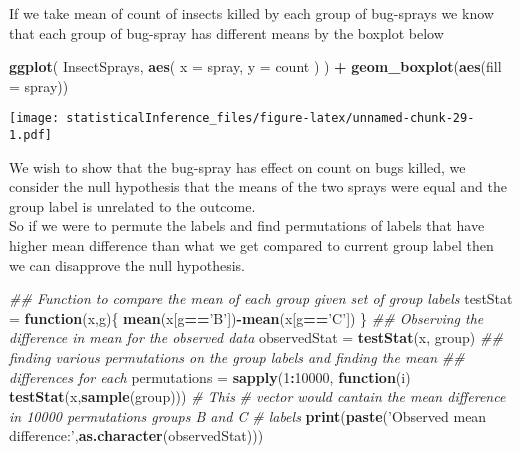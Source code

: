 \documentclass[
]{article}
\newenvironment{Shaded}{\begin{snugshade}}{\end{snugshade}}
\newcommand{\CommentTok}[1]{\textcolor[rgb]{0.56,0.35,0.01}{\textit{#1}}}
\newcommand{\ControlFlowTok}[1]{\textcolor[rgb]{0.13,0.29,0.53}{\textbf{#1}}}
\newcommand{\DataTypeTok}[1]{\textcolor[rgb]{0.13,0.29,0.53}{#1}}
\newcommand{\DecValTok}[1]{\textcolor[rgb]{0.00,0.00,0.81}{#1}}
\newcommand{\KeywordTok}[1]{\textcolor[rgb]{0.13,0.29,0.53}{\textbf{#1}}}
\newcommand{\NormalTok}[1]{#1}
\newcommand{\OperatorTok}[1]{\textcolor[rgb]{0.81,0.36,0.00}{\textbf{#1}}}
\newcommand{\StringTok}[1]{\textcolor[rgb]{0.31,0.60,0.02}{#1}}
\begin{document}
If we take mean of count of insects killed by each group of bug-sprays
we know that each group of bug-spray has different means by the boxplot
below

\begin{Shaded}
\begin{Highlighting}[]
\KeywordTok{ggplot}\NormalTok{(}
\NormalTok{  InsectSprays,}
  \KeywordTok{aes}\NormalTok{(}
    \DataTypeTok{x =}\NormalTok{ spray,}
    \DataTypeTok{y =}\NormalTok{ count}
\NormalTok{  )}
\NormalTok{) }\OperatorTok{+}\StringTok{ }\KeywordTok{geom_boxplot}\NormalTok{(}\KeywordTok{aes}\NormalTok{(}\DataTypeTok{fill =}\NormalTok{ spray))}
\end{Highlighting}
\end{Shaded}

\texttt{[image: statisticalInference\_files/figure-latex/unnamed-chunk-29-1.pdf]}

We wish to show that the bug-spray has effect on count on bugs killed,
we consider the null hypothesis that the means of the two sprays were
equal and the group label is unrelated to the outcome.\\
So if we were to permute the labels and find permutations of labels that
have higher mean difference than what we get compared to current group
label then we can disapprove the null hypothesis.

\begin{Shaded}
\begin{Highlighting}[]
\CommentTok{## Function to compare the mean of each group given set of group labels}
\NormalTok{testStat =}\StringTok{ }\ControlFlowTok{function}\NormalTok{(x,g)\{}
  \KeywordTok{mean}\NormalTok{(x[g}\OperatorTok{==}\StringTok{'B'}\NormalTok{])}\OperatorTok{-}\KeywordTok{mean}\NormalTok{(x[g}\OperatorTok{==}\StringTok{'C'}\NormalTok{])}
\NormalTok{\}}
\CommentTok{## Observing the difference in mean for the observed data}
\NormalTok{observedStat =}\StringTok{ }\KeywordTok{testStat}\NormalTok{(x, group)}
\CommentTok{## finding various permutations on the group labels and finding the mean }
\CommentTok{## differences for each}
\NormalTok{permutations =}\StringTok{ }\KeywordTok{sapply}\NormalTok{(}\DecValTok{1}\OperatorTok{:}\DecValTok{10000}\NormalTok{, }\ControlFlowTok{function}\NormalTok{(i) }\KeywordTok{testStat}\NormalTok{(x,}\KeywordTok{sample}\NormalTok{(group))) }\CommentTok{# This }
\CommentTok{# vector would cantain the mean difference in 10000 permutations groups B and C }
\CommentTok{# labels}
\KeywordTok{print}\NormalTok{(}\KeywordTok{paste}\NormalTok{(}\StringTok{'Observed mean difference:'}\NormalTok{,}\KeywordTok{as.character}\NormalTok{(observedStat)))}
\end{Highlighting}
\end{Shaded}
\end{document}
